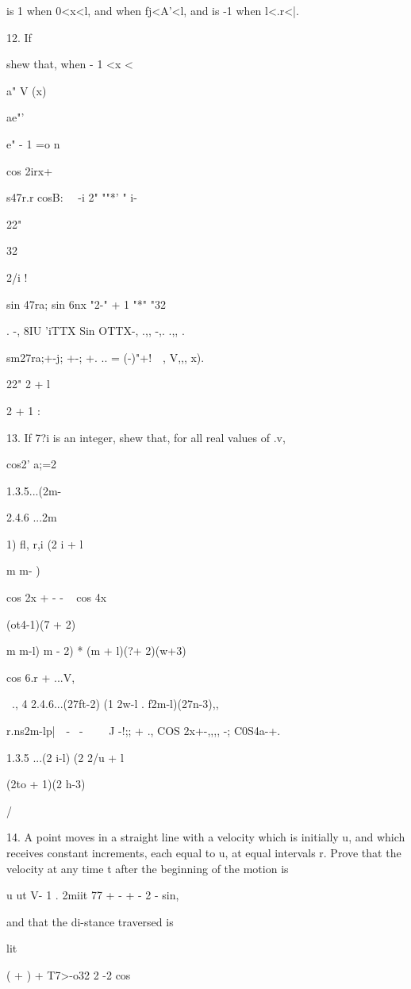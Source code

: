 is 1 when 0<x<l, and when fj<A'<l, and is -1 when l<.r<|.

12. If

shew that, when - 1 <x <\,

a" V (x)

ae"'

e" - 1 =o n

cos 2irx+

s47r.r cosB\pij: \ \ -i 2" ""*' " i-

22"

32

2/i !

sin 47ra; sin 6nx "2-" + 1 "*" "32

. -, 8IU 'iTTX Sin OTTX-, .,, -,. .,, .

sm27ra;+-j; +-; +. .. = (-)"+! \ \,, V,,, x).

22" 2 + l

2 + 1 :


13. If 7?i is an integer, shew that, for all real values of .v,

cos2' a;=2

1.3.5...(2m-

2.4.6 ...2m

1) fl, r,i (2 i + l

m m- )

cos 2x + - - ~ cos 4x

(ot4-1)(7 + 2)

m m-l) m - 2) * (m + l)(?\pi + 2)(w+3)

cos 6.r + ...V,

  \ ., 4 2.4.6...(27ft-2) (1 2w-l . f2m-l)(27n-3),,

r.ns2m-l\;p|\ \ - \ - \ \ \ \ J -!;; + ., COS 2x+-,,,, -;
C0S4a-+.

1.3.5 ...(2 i-l) (2 2/u + l

(2to + 1)(2 h-3)

/

14. A point moves in a straight line with a velocity which is
initially u, and which receives constant increments, each equal to u,
at equal intervals r. Prove that the velocity at any time t after the
beginning of the motion is

u ut V- 1 . 2miit 77 + - + - 2 - sin,

and that the di-stance traversed is

lit

( + ) + T7>-o32 2 -2 cos

